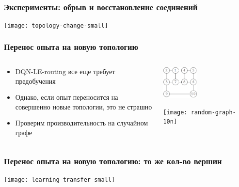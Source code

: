 \documentclass{beamer}
\begin{document}

\begin{frame}
  \frametitle{Эксперименты: обрыв и восстановление соединений}
  \texttt{[image: topology-change-small]} 
\end{frame}


\begin{frame}
  \frametitle{Перенос опыта на новую топологию}
  \begin{columns}
    \begin{column}{0.5\textwidth}
      \begin{itemize}
      \item DQN-LE-routing все еще требует предобучения
      \item Однако, если опыт переносится на совершенно новые топологии, это не страшно
      \item Проверим производительность на случайном графе 
      \end{itemize}
    \end{column}
    \begin{column}{0.5\textwidth}
      \begin{center}
          \centerline{\includegraphics[width=0.4\textwidth]{graph-2-1.png}}
          \centerline{\Big\downarrow}
          \centerline{\texttt{[image: random-graph-10n]}}
      \end{center}
    \end{column}
  \end{columns}
\end{frame}


\begin{frame}
  \frametitle{Перенос опыта на новую топологию: то же кол-во вершин}
  \texttt{[image: learning-transfer-small]} 
\end{frame}
\end{document}

